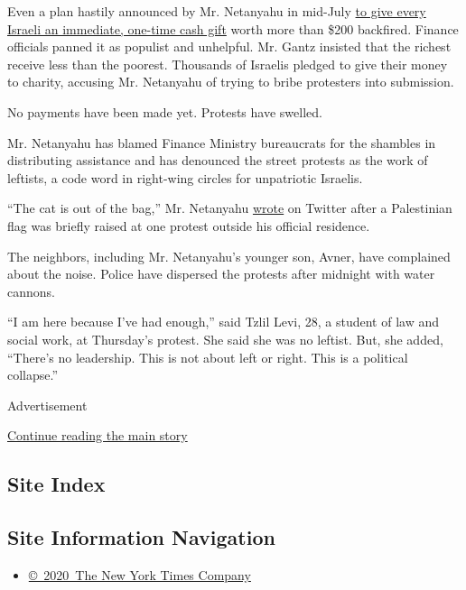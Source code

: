 Even a plan hastily announced by Mr. Netanyahu in mid-July
\href{https://en.globes.co.il/en/article-netanyahu-announces-grants-for-all-israelis-to-stimulate-economy-1001335997}{to
give every Israeli an immediate, one-time cash gift} worth more than
\$200 backfired. Finance officials panned it as populist and unhelpful.
Mr. Gantz insisted that the richest receive less than the poorest.
Thousands of Israelis pledged to give their money to charity, accusing
Mr. Netanyahu of trying to bribe protesters into submission.

No payments have been made yet. Protests have swelled.

Mr. Netanyahu has blamed Finance Ministry bureaucrats for the shambles
in distributing assistance and has denounced the street protests as the
work of leftists, a code word in right-wing circles for unpatriotic
Israelis.

``The cat is out of the bag,'' Mr. Netanyahu
\href{https://twitter.com/netanyahu/status/1284764559803322368}{wrote}
on Twitter after a Palestinian flag was briefly raised at one protest
outside his official residence.

The neighbors, including Mr. Netanyahu's younger son, Avner, have
complained about the noise. Police have dispersed the protests after
midnight with water cannons.

``I am here because I've had enough,'' said Tzlil Levi, 28, a student of
law and social work, at Thursday's protest. She said she was no leftist.
But, she added, ``There's no leadership. This is not about left or
right. This is a political collapse.''

Advertisement

\protect\hyperlink{after-bottom}{Continue reading the main story}

\hypertarget{site-index}{%
\subsection{Site Index}\label{site-index}}

\hypertarget{site-information-navigation}{%
\subsection{Site Information
Navigation}\label{site-information-navigation}}

\begin{itemize}
\tightlist
\item
  \href{https://help.nytimes3xbfgragh.onion/hc/en-us/articles/115014792127-Copyright-notice}{©~2020~The
  New York Times Company}
\end{itemize}

